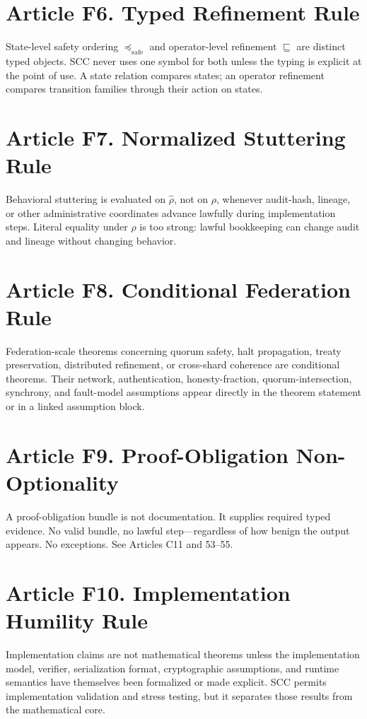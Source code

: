 \documentclass[10pt,oneside]{article}
\theoremstyle{definition}
\theoremstyle{remark}
\newcommand{\safe}{\mathrm{safe}}
\begin{document}
\section{Article F6. Typed Refinement Rule}
State-level safety ordering \(\preceq_{\safe}\) and operator-level refinement \(\sqsubseteq\) are distinct typed objects. SCC never uses one symbol for both unless the typing is explicit at the point of use. A state relation compares states; an operator refinement compares transition families through their action on states.

\section{Article F7. Normalized Stuttering Rule}
Behavioral stuttering is evaluated on \(\widehat{\rho}\), not on \(\rho\), whenever audit-hash, lineage, or other administrative coordinates advance lawfully during implementation steps. Literal equality under \(\rho\) is too strong: lawful bookkeeping can change audit and lineage without changing behavior.

\section{Article F8. Conditional Federation Rule}
Federation-scale theorems concerning quorum safety, halt propagation, treaty preservation, distributed refinement, or cross-shard coherence are conditional theorems. Their network, authentication, honesty-fraction, quorum-intersection, synchrony, and fault-model assumptions appear directly in the theorem statement or in a linked assumption block.

\section{Article F9. Proof-Obligation Non-Optionality}
A proof-obligation bundle is not documentation. It supplies required typed evidence. No valid bundle, no lawful step---regardless of how benign the output appears. No exceptions. See Articles C11 and 53--55.

\section{Article F10. Implementation Humility Rule}
Implementation claims are not mathematical theorems unless the implementation model, verifier, serialization format, cryptographic assumptions, and runtime semantics have themselves been formalized or made explicit. SCC permits implementation validation and stress testing, but it separates those results from the mathematical core.
\end{document}
